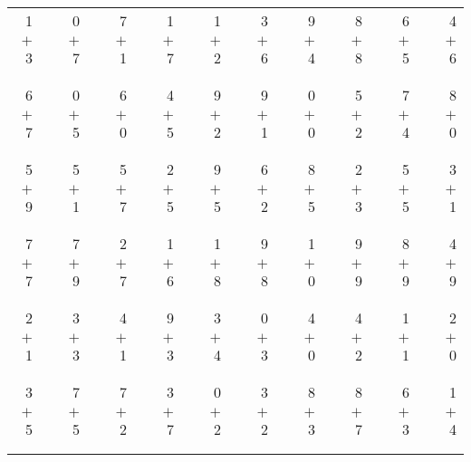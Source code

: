 \documentclass[12pt, letterpaper]{article}
\begin{document}
\begin{tabular}{rrrrrrrrrrrrrrrrrrr}
1 & & 0 & & 7 & & 1 & & 1 & & 3 & & 9 & & 8 & & 6 & & 4\\
$+$ 3 & & $+$ 7 & & $+$ 1 & & $+$ 7 & & $+$ 2 & & $+$ 6 & & $+$ 4 & & $+$ 8 & & $+$ 5 & & $+$ 6\\
\cline{1-1} \cline{3-3} \cline{5-5} \cline{7-7} \cline{9-9} \cline{11-11} \cline{13-13} \cline{15-15} \cline{17-17} \cline{19-19} \\ \\
6 & & 0 & & 6 & & 4 & & 9 & & 9 & & 0 & & 5 & & 7 & & 8\\
$+$ 7 & & $+$ 5 & & $+$ 0 & & $+$ 5 & & $+$ 2 & & $+$ 1 & & $+$ 0 & & $+$ 2 & & $+$ 4 & & $+$ 0\\
\cline{1-1} \cline{3-3} \cline{5-5} \cline{7-7} \cline{9-9} \cline{11-11} \cline{13-13} \cline{15-15} \cline{17-17} \cline{19-19} \\ \\
5 & & 5 & & 5 & & 2 & & 9 & & 6 & & 8 & & 2 & & 5 & & 3\\
$+$ 9 & & $+$ 1 & & $+$ 7 & & $+$ 5 & & $+$ 5 & & $+$ 2 & & $+$ 5 & & $+$ 3 & & $+$ 5 & & $+$ 1\\
\cline{1-1} \cline{3-3} \cline{5-5} \cline{7-7} \cline{9-9} \cline{11-11} \cline{13-13} \cline{15-15} \cline{17-17} \cline{19-19} \\ \\
7 & & 7 & & 2 & & 1 & & 1 & & 9 & & 1 & & 9 & & 8 & & 4\\
$+$ 7 & & $+$ 9 & & $+$ 7 & & $+$ 6 & & $+$ 8 & & $+$ 8 & & $+$ 0 & & $+$ 9 & & $+$ 9 & & $+$ 9\\
\cline{1-1} \cline{3-3} \cline{5-5} \cline{7-7} \cline{9-9} \cline{11-11} \cline{13-13} \cline{15-15} \cline{17-17} \cline{19-19} \\ \\
2 & & 3 & & 4 & & 9 & & 3 & & 0 & & 4 & & 4 & & 1 & & 2\\
$+$ 1 & & $+$ 3 & & $+$ 1 & & $+$ 3 & & $+$ 4 & & $+$ 3 & & $+$ 0 & & $+$ 2 & & $+$ 1 & & $+$ 0\\
\cline{1-1} \cline{3-3} \cline{5-5} \cline{7-7} \cline{9-9} \cline{11-11} \cline{13-13} \cline{15-15} \cline{17-17} \cline{19-19} \\ \\
3 & & 7 & & 7 & & 3 & & 0 & & 3 & & 8 & & 8 & & 6 & & 1\\
$+$ 5 & & $+$ 5 & & $+$ 2 & & $+$ 7 & & $+$ 2 & & $+$ 2 & & $+$ 3 & & $+$ 7 & & $+$ 3 & & $+$ 4\\
\cline{1-1} \cline{3-3} \cline{5-5} \cline{7-7} \cline{9-9} \cline{11-11} \cline{13-13} \cline{15-15} \cline{17-17} \cline{19-19} \\ \\

\end{tabular}
\end{document}
